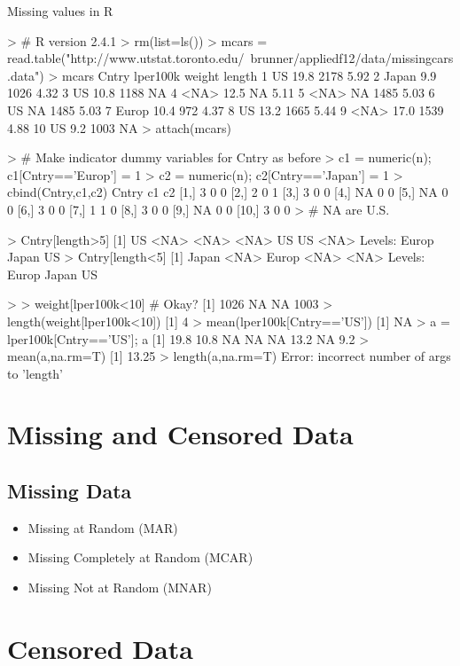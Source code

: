 Missing values in R

> # R version 2.4.1
> rm(list=ls())
> mcars = read.table("http://www.utstat.toronto.edu/~brunner/appliedf12/data/missingcars.data")
> mcars
   Cntry lper100k weight length
1     US     19.8   2178   5.92
2  Japan      9.9   1026   4.32
3     US     10.8   1188     NA
4   <NA>     12.5     NA   5.11
5   <NA>       NA   1485   5.03
6     US       NA   1485   5.03
7  Europ     10.4    972   4.37
8     US     13.2   1665   5.44
9   <NA>     17.0   1539   4.88
10    US      9.2   1003     NA
> attach(mcars)

> # Make indicator dummy variables for Cntry as before
> c1 = numeric(n); c1[Cntry=='Europ'] = 1
> c2 = numeric(n); c2[Cntry=='Japan'] = 1
> cbind(Cntry,c1,c2)
      Cntry c1 c2
 [1,]     3  0  0
 [2,]     2  0  1
 [3,]     3  0  0
 [4,]    NA  0  0
 [5,]    NA  0  0
 [6,]     3  0  0
 [7,]     1  1  0
 [8,]     3  0  0
 [9,]    NA  0  0
[10,]     3  0  0
> # NA are U.S.

> Cntry[length>5]
[1] US   <NA> <NA> <NA> US   US   <NA>
Levels: Europ Japan US
> Cntry[length<5]
[1] Japan <NA>  Europ <NA>  <NA> 
Levels: Europ Japan US


> 
> weight[lper100k<10] # Okay?
[1] 1026   NA   NA 1003
> length(weight[lper100k<10]) 
[1] 4
> mean(lper100k[Cntry=='US'])
[1] NA
> a = lper100k[Cntry=='US']; a
[1] 19.8 10.8   NA   NA   NA 13.2   NA  9.2
> mean(a,na.rm=T)
[1] 13.25
> length(a,na.rm=T)
Error: incorrect number of args to 'length'




\section{Missing and Censored Data}
\subsection{Missing Data}


\begin{itemize}
\item Missing at Random (MAR)
\item Missing Completely at Random (MCAR)
\item Missing Not at Random (MNAR)
\end{itemize}

\section{Censored Data}

